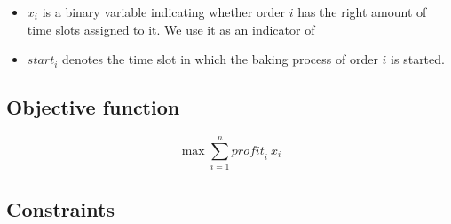 \documentclass{article}
\begin{document}
\begin{itemize}
\item $x_i$ is a binary variable indicating whether order $i$ has the right amount of time slots assigned to it. 
We use it as an indicator of 
\item $\mathit{start}_{i}$ denotes the time slot in which the baking process of order $i$ is started.
\end{itemize}

\subsection{Objective function}

\begin{equation*}
  \max \sum^n_{i = 1} \mathit{profit}_i \: x_i
\end{equation*}

\subsection{Constraints}
\end{document}
